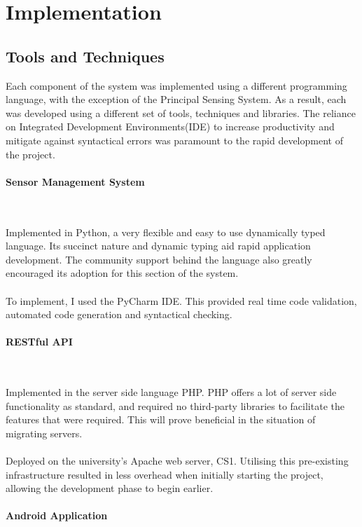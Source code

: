 \documentclass{article}
\begin{document}
\newpage
\section{Implementation	}

\subsection{Tools and Techniques}
Each component of the system was implemented using a different programming language, with the exception of the Principal Sensing System. As a result, each was developed using a different set of tools, techniques and libraries. The reliance on Integrated Development Environments(IDE) to increase productivity and mitigate against syntactical errors was paramount to the rapid development of the project. 

\paragraph{Sensor Management System}\

\noindent
Implemented in Python, a very flexible and easy to use dynamically typed language. Its succinct nature and dynamic typing aid rapid application development. The community support behind the language also greatly encouraged its adoption for this section of the system. \\\\ To implement, I used the PyCharm IDE. This provided real time code validation, automated code generation and syntactical checking.

\paragraph{RESTful API}\

\noindent
Implemented in the server side language PHP. PHP offers a lot of server side functionality as standard, and required no third-party libraries to facilitate the features that were required. This will prove beneficial in the situation of migrating servers. \\\\ Deployed on the university\rq s Apache web server, CS1. Utilising this pre-existing infrastructure resulted in less overhead when initially starting the project, allowing the development phase to begin earlier. 

\paragraph{Android Application}\
\end{document}
